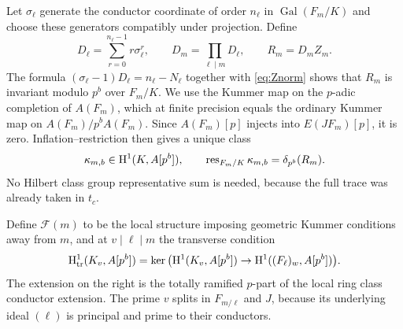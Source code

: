 \documentclass[11pt]{article}
\theoremstyle{definition}\newtheorem{definition}[theorem]{Definition}
\theoremstyle{remark}\newtheorem{remark}[theorem]{Remark}
\newcommand{\Gal}{\operatorname{Gal}}\newcommand{\Res}{\operatorname{Res}}
\begin{document}
Let $\sigma_\ell$ generate the conductor coordinate of order $n_\ell$ in $\Gal(F_m/K)$ and choose these generators compatibly under projection. Define
\[
 D_\ell=\sum_{r=0}^{n_\ell-1}r\sigma_\ell^r,\qquad D_m=\prod_{\ell\mid m}D_\ell,\qquad R_m=D_mZ_m.
\]
The formula $(\sigma_\ell-1)D_\ell=n_\ell-N_\ell$ together with \eqref{eq:Znorm} shows that $R_m$ is invariant modulo $p^b$ over $F_m/K$. We use the Kummer map on the $p$-adic completion of $A(F_m)$, which at finite precision equals the ordinary Kummer map on $A(F_m)/p^b A(F_m)$. Since $A(F_m)[p]$ injects into $E(JF_m)[p]$, it is zero. Inflation--restriction then gives a unique class
\begin{equation}\label{eq:kappa}
 \kappa_{m,b}\in\mathrm H^1(K,A[p^b]),\qquad
 \operatorname{res}_{F_m/K}\kappa_{m,b}=\delta_{p^b}(R_m).
\end{equation}
No Hilbert class group representative sum is needed, because the full trace was already taken in $t_c$.

Define $\mathcal F(m)$ to be the local structure imposing geometric Kummer conditions away from $m$, and at $v\mid\ell\mid m$ the transverse condition
\[
 \mathrm H^1_{\mathrm{tr}}(K_v,A[p^b])=
 \ker\big(\mathrm H^1(K_v,A[p^b])\to\mathrm H^1((F_\ell)_w,A[p^b])\big).
\]
The extension on the right is the totally ramified $p$-part of the local ring class conductor extension. The prime $v$ splits in $F_{m/\ell}$ and $J$, because its underlying ideal $(\ell)$ is principal and prime to their conductors.
\end{document}
